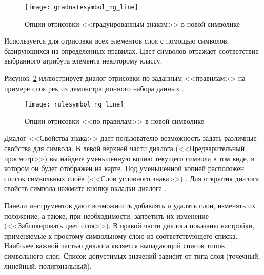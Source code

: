 \begin{figure}[ht]
   \centering
   \texttt{[image: graduatesymbol\_ng\_line]}
   \caption{Опции  отрисовки <<градуированным знаком>> в новой символике \wincaption}\label{fig:gradsymNG}
\end{figure}


Используется для отрисовки всех элементов слоя с помощью символов,
базирующихся на определенных правилах. Цвет символов отражает
соответствие выбранного атрибута элемента некоторому классу.


Рисунок~\ref{fig:rulesymNG} иллюстрирует диалог отрисовки по заданным
<<правилам>> на примере слоя рек из демонстрационного набора данных \qg.

\begin{figure}[ht]
   \centering
   \texttt{[image: rulesymbol\_ng\_line]}
   \caption{Опции отрисовки <<по правилам>> в новой символике \wincaption}\label{fig:rulesymNG}
\end{figure}


Диалог <<Свойства знака>> дает пользователю возможность задать различные
свойства для символа. В левой верхней части диалога (<<Предварительный
просмотр>>)  вы найдете уменьшенную копию текущего символа в том виде,
в котором он будет отображен на карте. Под уменьшенной копией расположен
список символьных слоёв (<<Слои условного знака>>) . Для открытия диалога
свойств символа нажмите кнопку 
вкладки  диалога .

Панели инструментов дают возможность добавлять и удалять слои, изменять их
положение, а также, при необходимости, запретить их изменение
(<<Заблокировать цвет слоя>>). В правой части диалога показаны настройки,
применяемые к простому символьному слою из соответствующего списка. Наиболее
важной частью диалога является выпадающий список типов символьного слоя.
Список допустимых значений зависит от типа слоя (точечный, линейный,
полигональный).

